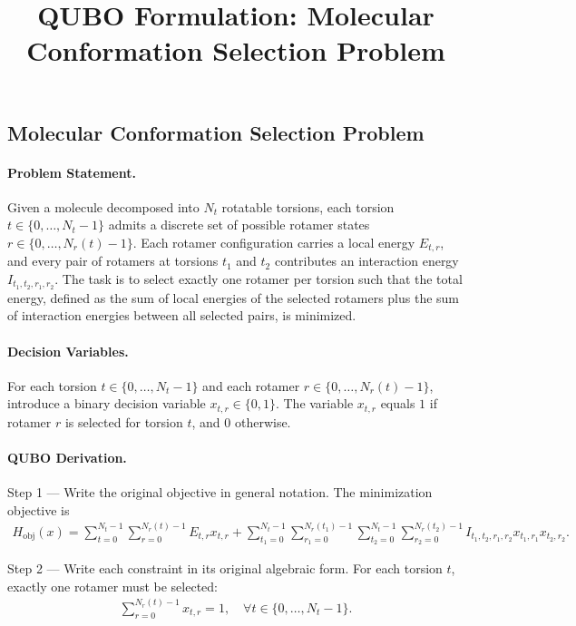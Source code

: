 \documentclass[12pt]{article}
\title{QUBO Formulation: Molecular Conformation Selection Problem}
\date{}
\begin{document}
\maketitle

\subsection*{Molecular Conformation Selection Problem}

\paragraph{Problem Statement.}
Given a molecule decomposed into $N_t$ rotatable torsions, each torsion $t \in \{0, \dots, N_t-1\}$ admits a discrete set of possible rotamer states $r \in \{0, \dots, N_r(t)-1\}$. Each rotamer configuration carries a local energy $E_{t,r}$, and every pair of rotamers at torsions $t_1$ and $t_2$ contributes an interaction energy $I_{t_1, t_2, r_1, r_2}$. The task is to select exactly one rotamer per torsion such that the total energy, defined as the sum of local energies of the selected rotamers plus the sum of interaction energies between all selected pairs, is minimized.

\paragraph{Decision Variables.}
For each torsion $t \in \{0, \dots, N_t-1\}$ and each rotamer $r \in \{0, \dots, N_r(t)-1\}$, introduce a binary decision variable $x_{t,r} \in \{0,1\}$. The variable $x_{t,r}$ equals $1$ if rotamer $r$ is selected for torsion $t$, and $0$ otherwise.

\paragraph{QUBO Derivation.}
Step 1 --- Write the original objective in general notation. The minimization objective is
\begin{align}
H_{\text{obj}}(x) = \sum_{t=0}^{N_t-1} \sum_{r=0}^{N_r(t)-1} E_{t,r} x_{t,r} + \sum_{t_1=0}^{N_t-1} \sum_{r_1=0}^{N_r(t_1)-1} \sum_{t_2=0}^{N_t-1} \sum_{r_2=0}^{N_r(t_2)-1} I_{t_1, t_2, r_1, r_2} x_{t_1, r_1} x_{t_2, r_2}.
\end{align}

Step 2 --- Write each constraint in its original algebraic form. For each torsion $t$, exactly one rotamer must be selected:
\begin{align}
\sum_{r=0}^{N_r(t)-1} x_{t,r} = 1, \quad \forall t \in \{0, \dots, N_t-1\}.
\end{align}
\end{document}
